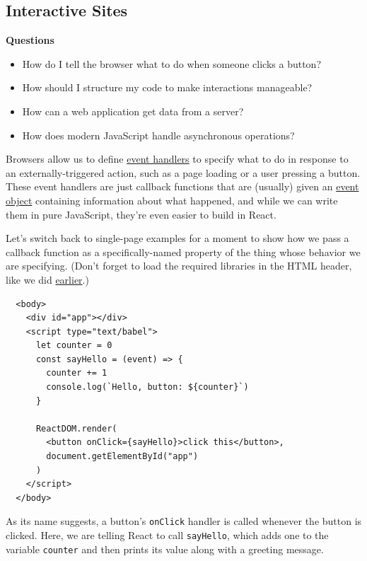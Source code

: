 \hypertarget{s:interactive}{\subsection{Interactive
Sites}\label{s:interactive}}

\textbf{Questions}

\begin{itemize}
\tightlist
\item
  How do I tell the browser what to do when someone clicks a button?
\item
  How should I structure my code to make interactions manageable?
\item
  How can a web application get data from a server?
\item
  How does modern JavaScript handle asynchronous operations?
\end{itemize}

Browsers allow us to define \protect\hyperlink{g:event-handler}{event
handlers} to specify what to do in response to an externally-triggered
action, such as a page loading or a user pressing a button. These event
handlers are just callback functions that are (usually) given an
\protect\hyperlink{g:event-object}{event object} containing information
about what happened, and while we can write them in pure JavaScript,
they're even easier to build in React.

Let's switch back to single-page examples for a moment to show how we
pass a callback function as a specifically-named property of the thing
whose behavior we are specifying. (Don't forget to load the required
libraries in the HTML header, like we did
\protect\hyperlink{s:dynamic}{earlier}.)

\begin{verbatim}
  <body>
    <div id="app"></div>
    <script type="text/babel">
      let counter = 0
      const sayHello = (event) => {
        counter += 1
        console.log(`Hello, button: ${counter}`)
      }

      ReactDOM.render(
        <button onClick={sayHello}>click this</button>,
        document.getElementById("app")
      )
    </script>
  </body>
\end{verbatim}

As its name suggests, a button's \texttt{onClick} handler is called
whenever the button is clicked. Here, we are telling React to call
\texttt{sayHello}, which adds one to the variable \texttt{counter} and
then prints its value along with a greeting message.

